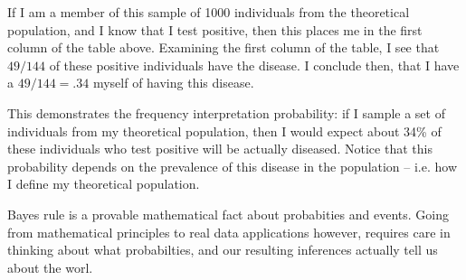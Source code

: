 \documentclass[11pt]{article}
\theoremstyle{definition}
\begin{document}
If I am a member of this sample of 1000 individuals
from the theoretical population, and I know that
I test positive, then this places me in the first
column of the table above.
Examining the first column of the table, I see
that $49 / 144$ of these positive individuals
have the disease. I conclude then,
that I have a $49 / 144 = .34$ myself
of having this disease.

This demonstrates the frequency interpretation
probability: if I sample a set of
individuals from my theoretical population,
then I would expect
about 34\% of these individuals who test
positive will be actually diseased.
Notice that this probability depends on the
prevalence of this disease in the population -- i.e.
how I define my theoretical population.

Bayes rule is a provable mathematical fact about
probabities and events.
Going from mathematical principles to real data
applications however, requires care in
thinking about what probabilties, and our resulting
inferences actually tell us about the worl.
\end{document}

